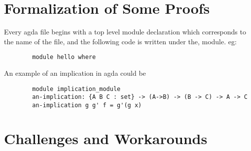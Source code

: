 \documentclass[12pt]{article}
\begin{document}
\section{Formalization of Some Proofs}
Every agda file begins with a top level module declaration which corresponds to the name of the file, 
and the following code is written under the, module. 
eg: 
\begin{verbatim}
        module hello where
\end{verbatim}

An example of an implication in agda could be 
\begin{verbatim}
        module implication_module
        an-implication: {A B C : set} -> (A->B) -> (B -> C) -> A -> C 
        an-implication g g' f = g'(g x)
\end{verbatim}


 

\section{Challenges and Workarounds}





 

\end{document}
